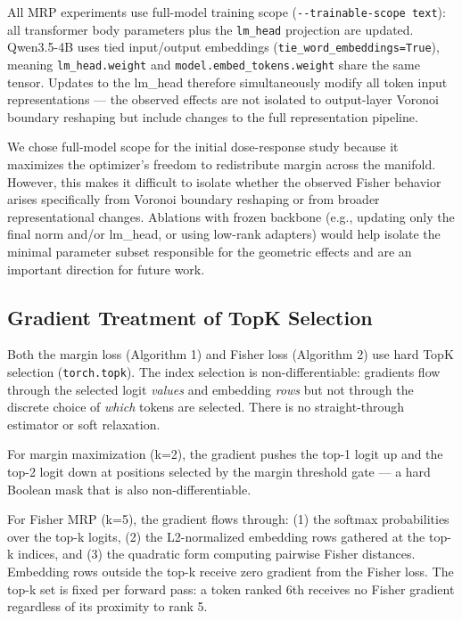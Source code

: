 \documentclass[
  11pt,
]{article}
\begin{document}
All MRP experiments use full-model training scope
(\texttt{-\/-trainable-scope\ text}): all transformer body parameters
plus the \texttt{lm\_head} projection are updated. Qwen3.5-4B uses tied
input/output embeddings (\texttt{tie\_word\_embeddings=True}), meaning
\texttt{lm\_head.weight} and \texttt{model.embed\_tokens.weight} share
the same tensor. Updates to the lm\_head therefore simultaneously modify
all token input representations --- the observed effects are not
isolated to output-layer Voronoi boundary reshaping but include changes
to the full representation pipeline.

We chose full-model scope for the initial dose-response study because it
maximizes the optimizer's freedom to redistribute margin across the
manifold. However, this makes it difficult to isolate whether the
observed Fisher behavior arises specifically from Voronoi boundary
reshaping or from broader representational changes. Ablations with
frozen backbone (e.g., updating only the final norm and/or lm\_head, or
using low-rank adapters) would help isolate the minimal parameter subset
responsible for the geometric effects and are an important direction for
future work.

\hypertarget{gradient-treatment-of-topk-selection}{%
\subsection{Gradient Treatment of TopK
Selection}\label{gradient-treatment-of-topk-selection}}

Both the margin loss (Algorithm 1) and Fisher loss (Algorithm 2) use
hard TopK selection (\texttt{torch.topk}). The index selection is
non-differentiable: gradients flow through the selected logit
\emph{values} and embedding \emph{rows} but not through the discrete
choice of \emph{which} tokens are selected. There is no straight-through
estimator or soft relaxation.

For margin maximization (k=2), the gradient pushes the top-1 logit up
and the top-2 logit down at positions selected by the margin threshold
gate --- a hard Boolean mask that is also non-differentiable.

For Fisher MRP (k=5), the gradient flows through: (1) the softmax
probabilities over the top-k logits, (2) the L2-normalized embedding
rows gathered at the top-k indices, and (3) the quadratic form computing
pairwise Fisher distances. Embedding rows outside the top-k receive zero
gradient from the Fisher loss. The top-k set is fixed per forward pass:
a token ranked 6th receives no Fisher gradient regardless of its
proximity to rank 5.
\end{document}
